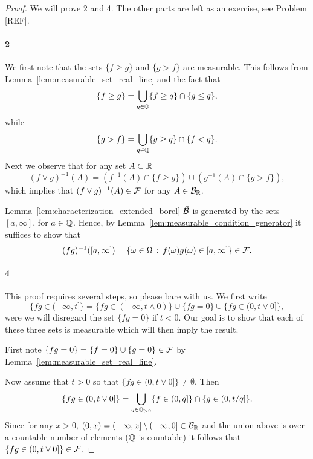 \begin{proof}
We will prove 2 and 4. The other parts are left as an exercise, see Problem [REF].

\paragraph{2} We first note that the sets $\{f \ge g\}$ and $\{g > f\}$ are measurable. This follows from Lemma~\ref{lem:measurable_set_real_line} and the fact that
\[
	\{f \ge g\} = \bigcup_{q \in \mathbb Q} \{f \ge q\} \cap \{g \le q\},
\]
while
\[
	\{g > f\} = \bigcup_{q \in \mathbb Q} \{g \ge q\} \cap \{f < q\}.
\]
Next we observe that for any set $A \subset \mathbb R$
\[
	(f \vee g)^{-1}(A) = \left(f^{-1}(A) \cap \{f \ge g\}\right) \cup \left(g^{-1}(A) \cap \{g > f\}\right),
\]
which implies that $(f \vee g)^{-1}(A) \in \mathcal F$ for any $A \in \mathcal B_{\mathbb R}$.

Lemma~\ref{lem:characterization_extended_borel} $\bar{\mathcal B}$ is generated by the sets $[a,\infty]$, for $a \in \mathbb Q$. Hence, by Lemma~\ref{lem:measurable_condition_generator} it suffices to show that 
\[
	(fg)^{-1}([a,\infty]) = \{\omega \in \Omega \, : \, f(\omega) g(\omega) \in [a, \infty]\} \in \mathcal F.
\]

\paragraph{4} This proof requires several steps, so please bare with us. We first write
\[
	\{fg \in (-\infty, t]\} = \{fg \in (-\infty, t \wedge 0)\} \cup \{fg = 0\} \cup \{fg \in (0,t \vee 0]\},
\]
were we will disregard the set $\{fg = 0\}$ if $t < 0$. Our goal is to show that each of these three sets is measurable which will then imply the result.

First note $\{fg = 0\} = \{f = 0\} \cup \{g = 0\} \in \mathcal F$ by Lemma~\ref{lem:measurable_set_real_line}.

Now assume that $t > 0$ so that $\{fg \in (0,t \vee 0]\} \ne \emptyset$. Then
\[
	\{fg \in (0,t \vee 0]\} = \bigcup_{q \in \mathbb Q_{>0}} \{f \in (0,q]\} \cap \{g \in (0,t/q]\}.
\]
Since for any $x >0$, $(0,x) = (-\infty,x] \setminus (-\infty,0] \in \mathcal B_{\mathbb R}$ and the union above is over a countable number of elements ($\mathbb Q$ is countable) it follows that $\{fg \in (0,t \vee 0]\} \in \mathcal F$.


\end{proof}
